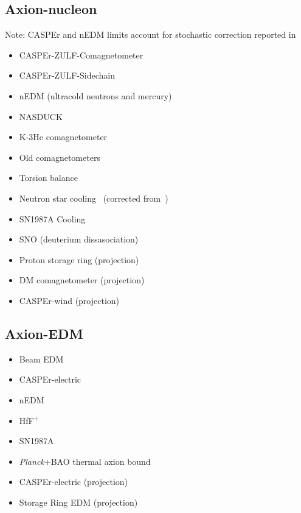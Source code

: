 \documentclass[11pt,twocolumn]{extarticle}
\begin{document}
\begin{mdframed}
\vspace{-1em}
\section{Axion-nucleon}\vspace{-0.5em}
Note: CASPEr and nEDM limits account for stochastic correction reported in~\cite{Centers:2019dyn}
\begin{itemize}\setlength\itemsep{-0.5em}
    \item CASPEr-ZULF-Comagnetometer~\cite{Wu:2019exd}
    \item CASPEr-ZULF-Sidechain~\cite{Garcon:2019inh}
    \item nEDM (ultracold neutrons and mercury)~\cite{Abel:2017rtm}
    \item NASDUCK~\cite{Bloch:2021vnn,Bloch:2022kjm}
    \item K-3He comagnetometer~\cite{Vasilakis2009}
    \item Old comagnetometers~\cite{Bloch:2019lcy}
    \item Torsion balance~\cite{Adelberger:2006dh}
    \item Neutron star cooling~\cite{Buschmann:2021juv} (corrected from~\cite{Beznogov:2018fda})
    \item SN1987A Cooling~\cite{Carenza:2019pxu}
    \item SNO (deuterium dissasociation)~\cite{Bhusal:2020bvx}
    \item Proton storage ring (projection)~\cite{Graham:2020kai}
    \item DM comagnetometer (projection)~\cite{Bloch:2019lcy}
    \item CASPEr-wind (projection)~\cite{Garcon:2019inh}
\end{itemize}
\end{mdframed}

\begin{mdframed}
\vspace{-1em}
\section{Axion-EDM}\vspace{-0.5em}
\begin{itemize}\setlength\itemsep{-0.5em}
	\item Beam EDM~\cite{Schulthess:2022pbp}
	\item CASPEr-electric~\cite{Aybas:2021nvn}
	\item nEDM~\cite{Abel:2017rtm}
	\item HfF$^+$~\cite{Roussy:2020ily}
	\item SN1987A~\cite{Graham:2013gfa}
	\item \emph{Planck}+BAO thermal axion bound~\cite{Caloni:2022uya}
	\item CASPEr-electric (projection)~\cite{JacksonKimball:2017elr}	
	\item Storage Ring EDM (projection)~\cite{JacksonKimball:2017elr}	
	
\end{itemize}
\end{mdframed}
\end{document}
